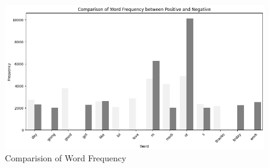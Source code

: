 \begin{figure}[H]
    \centering
    \includegraphics[width=\textwidth]{img/visualize_pic/comparision.png}
    \caption{Comparision of Word Frequency}
\end{figure}

\newpage
